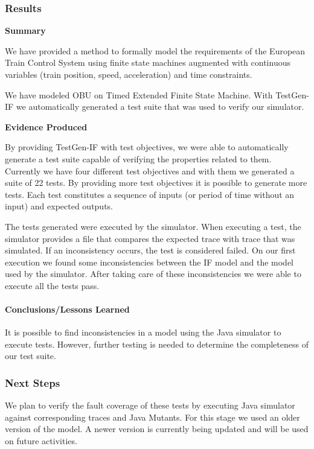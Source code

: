 \documentclass{template/openetcs_article}
\begin{document}
\subsubsection{Results}

\textbf{Summary}

We have provided a method to formally model the
requirements of the European Train Control System using finite state machines
augmented with continuous variables (train position, speed, acceleration) and
time constraints. 

We have modeled OBU on Timed Extended Finite State Machine.
With TestGen-IF we automatically generated a test suite that was used to verify our simulator.
%

\textbf{Evidence Produced}

By providing TestGen-IF with test objectives, we were able to automatically generate a test suite capable of verifying the properties related to them. Currently we have four different test objectives and with them we generated a suite of 22 tests. By providing more test objectives it is possible to generate more tests.
Each test constitutes a sequence of inputs (or period of time without an input) and expected outputs.

The tests generated were executed by the simulator. When executing a test, the simulator provides a file that compares the expected trace with trace that was simulated. If an inconsistency occurs, the test is considered failed. On our first execution we found some inconsistencies between the IF model and the model used by the simulator. After taking care of these inconsistencies we were able to execute all the tests pass.

\paragraph{Conclusions/Lessons Learned}
It is possible to find inconsistencies in a model using the Java simulator to execute tests. However, further testing is needed to determine the completeness of our test suite.

\subsubsection{Next Steps}
We plan to verify the fault coverage of these tests by executing Java
simulator against corresponding traces and Java Mutants. For this stage we used an older version of the model. A newer version is currently being updated and will be used on future activities.
\end{document}

